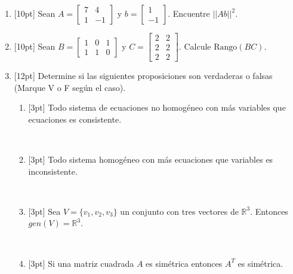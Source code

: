 \documentclass[11pt]{article}
\newcommand{\vf}{\fbox{V}\ \fbox{F}}
\begin{document}
\begin{enumerate}
\item{}[10pt] Sean $A = \begin{bmatrix}7 & 4\\ 1 & -1\end{bmatrix}$ y $b = \begin{bmatrix}1\\-1\end{bmatrix}$. Encuentre $||Ab||^2$.

\vspace{4pt}

\item{}[10pt] Sean $B = \begin{bmatrix}1 & 0 & 1\\ 1 & 1 & 0\end{bmatrix}$ y $C = \begin{bmatrix}2 & 2\\ 2 & 2\\ 2 & 2\end{bmatrix}$. Calcule $\mathrm{Rango}(BC)$.

\vspace{4pt}

\item{}[12pt] Determine si las siguientes proposiciones son verdaderas o falsas (Marque V o F según el caso).
\begin{enumerate}
\item{}[3pt] Todo sistema de ecuaciones no homogéneo con más variables que ecuaciones es consistente.

\vf

\item{}[3pt] Todo sistema homogéneo con más ecuaciones que variables es inconsistente.

\vf

\item{}[3pt] Sea $V=\{v_1,v_2,v_3\}$ un conjunto con tres vectores de $\mathbb{R}^3$. Entonces $gen(V)=\mathbb{R}^3$.

\vf

\item{}[3pt] Si una matriz cuadrada $A$ es simétrica entonces $A^T$ es simétrica.


\end{enumerate}
\end{enumerate}
\end{document}

